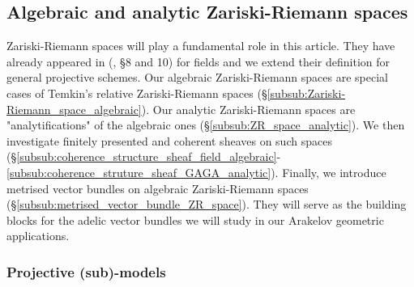 \documentclass [11pt,reqno]{amsart}
\newcommand{\1}{\mathmybb{1}}
\def\cO{{\mathcal{O}}}
\def\an{\operatorname{an}}
\def\diff{\mathrm{d}}
\def\dc{\mathrm{d}^c}
\def\MA{\operatorname{MA}}
\begin{document}

\subsection{Algebraic and analytic Zariski-Riemann spaces}
\label{sub:ZR_analytic_spaces}

Zariski-Riemann spaces will play a fundamental role in this article. They have already appeared in (\cite{Sedillot_pav}, \S 8 and 10) for fields and we extend their definition for general projective schemes. Our algebraic Zariski-Riemann spaces are special cases of Temkin's relative Zariski-Riemann spaces \cite{Temkin11} (\S \ref{subsub:Zariski-Riemann_space_algebraic}). Our analytic Zariski-Riemann spaces are "analytifications" of the algebraic ones (\S \ref{subsub:ZR_space_analytic}). We then investigate finitely presented and coherent sheaves on such spaces (\S \ref{subsub:coherence_structure_sheaf_field_algebraic}-\ref{subsub:coherence_struture_sheaf_GAGA_analytic}). Finally, we introduce metrised vector bundles on algebraic Zariski-Riemann spaces (\S \ref{subsub:metrised_vector_bundle_ZR_space}). They will serve as the building blocks for the adelic vector bundles we will study in our Arakelov geometric applications.

\subsubsection{Projective (sub)-models}
\label{subsub:projective_sub-models}
\end{document}
